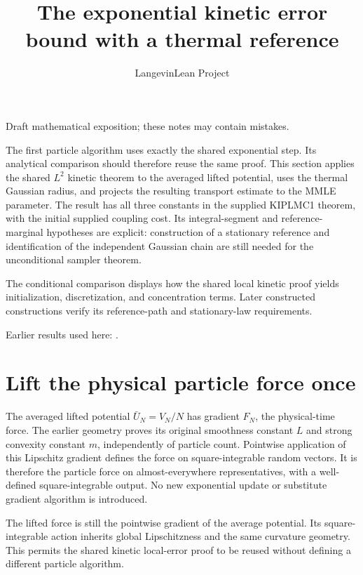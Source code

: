 \documentclass[11pt,a4paper]{article}
\title{\texorpdfstring{The exponential kinetic error bound with a thermal reference}{The exponential kinetic error bound with a thermal reference}}
\author{LangevinLean Project}
\date{}
\begin{document}
\maketitle
Draft mathematical exposition; these notes may contain mistakes.


The first particle algorithm uses exactly the shared exponential step. Its analytical comparison should therefore reuse the same proof. This section applies the shared \(L^{2}\) kinetic theorem to the averaged lifted potential, uses the thermal Gaussian radius, and projects the resulting transport estimate to the MMLE parameter. The result has all three constants in the supplied KIPLMC1 theorem, with the initial supplied coupling cost. Its integral-segment and reference-marginal hypotheses are explicit: construction of a stationary reference and identification of the independent Gaussian chain are still needed for the unconditional sampler theorem.



The conditional comparison displays how the shared local kinetic proof yields initialization, discretization, and concentration terms. Later constructed constructions verify its reference-path and stationary-law requirements.



Earlier results used here: \cite[Section~3.42]{LangevinLean2026Kinetic}.

\section{\texorpdfstring{Lift the physical particle force once}{Lift the physical particle force once}}


The averaged lifted potential \(\bar U_N=V_N/N\) has gradient \(F_N\), the physical-time force. The earlier geometry proves its original smoothness constant \(L\) and strong convexity constant \(m\), independently of particle count. Pointwise application of this Lipschitz gradient defines the force on square-integrable random vectors. It is therefore the particle force on almost-everywhere representatives, with a well-defined square-integrable output. No new exponential update or substitute gradient algorithm is introduced.



The lifted force is still the pointwise gradient of the average potential. Its square-integrable action inherits global Lipschitzness and the same curvature geometry. This permits the shared kinetic local-error proof to be reused without defining a different particle algorithm.
\end{document}
